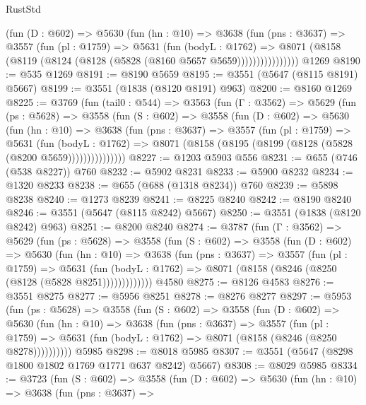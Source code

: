 \begin{lexlean}{RustStd}
\begin{coremodule}
              (fun (D : @602) =>
              @5630
                (fun (hn : @10) =>
                @3638
                  (fun (pns : @3637) =>
                  @3557
                    (fun (pl : @1759) =>
                    @5631
                      (fun (bodyL : @1762) =>
                      @8071 (@8158 (@8119 (@8124 (@8128 (@5828 (@8160 @5657 @5659))))))))))))))))
    @1269
@8190 := @535 @1269
@8191 := @8190 @5659
@8195 := @3551 (@5647 (@8115 @8191) @5667)
@8199 := @3551 (@1838 (@8120 @8191) @963)
@8200 := @8160 @1269
@8225 := @3769
    (fun (tail0 : @544) =>
    @3563
      (fun (Γ : @3562) =>
      @5629
        (fun (ps : @5628) =>
        @3558
          (fun (S : @602) =>
          @3558
            (fun (D : @602) =>
            @5630
              (fun (hn : @10) =>
              @3638
                (fun (pns : @3637) =>
                @3557
                  (fun (pl : @1759) =>
                  @5631
                    (fun (bodyL : @1762) =>
                    @8071 (@8158 (@8195 (@8199 (@8128 (@5828 (@8200 @5659)))))))))))))))
@8227 := @1203 @5903 @556
@8231 := @655 (@746 (@538 @8227)) @760
@8232 := @5902 @8231
@8233 := @5900 @8232
@8234 := @1320 @8233
@8238 := @655 (@688 (@1318 @8234)) @760
@8239 := @5898 @8238
@8240 := @1273 @8239
@8241 := @8225 @8240
@8242 := @8190 @8240
@8246 := @3551 (@5647 (@8115 @8242) @5667)
@8250 := @3551 (@1838 (@8120 @8242) @963)
@8251 := @8200 @8240
@8274 := @3787
    (fun (Γ : @3562) =>
    @5629
      (fun (ps : @5628) =>
      @3558
        (fun (S : @602) =>
        @3558
          (fun (D : @602) =>
          @5630
            (fun (hn : @10) =>
            @3638
              (fun (pns : @3637) =>
              @3557
                (fun (pl : @1759) =>
                @5631
                  (fun (bodyL : @1762) =>
                  @8071 (@8158 (@8246 (@8250 (@8128 (@5828 @8251)))))))))))))
    @4580
@8275 := @8126 @4583
@8276 := @3551 @8275
@8277 := @5956 @8251
@8278 := @8276 @8277
@8297 := @5953
    (fun (ps : @5628) =>
    @3558
      (fun (S : @602) =>
      @3558
        (fun (D : @602) =>
        @5630
          (fun (hn : @10) =>
          @3638
            (fun (pns : @3637) =>
            @3557
              (fun (pl : @1759) =>
              @5631 (fun (bodyL : @1762) => @8071 (@8158 (@8246 (@8250 @8278))))))))))
    @5985
@8298 := @8018 @5985
@8307 := @3551 (@5647 (@8298 @1800 @1802 @1769 @1771 @637 @8242) @5667)
@8308 := @8029 @5985
@8334 := @3723
    (fun (S : @602) =>
    @3558
      (fun (D : @602) =>
      @5630
        (fun (hn : @10) =>
        @3638
          (fun (pns : @3637) =>

\end{coremodule}
\end{lexlean}
